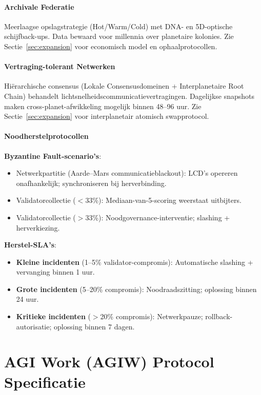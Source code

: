 \documentclass[11pt]{article}
\begin{document}
\paragraph{Archivale Federatie}
Meerlaagse opslagstrategie (Hot/Warm/Cold) met DNA- en 5D-optische schijfback-ups. Data bewaard voor millennia over planetaire kolonies. Zie Sectie~\ref{sec:expansion} voor economisch model en ophaalprotocollen.

\paragraph{Vertraging-tolerant Netwerken}
Hiërarchische consensus (Lokale Consensusdomeinen + Interplanetaire Root Chain) behandelt lichtsnelheidscommunicatievertragingen. Dagelijkse snapshots maken cross-planet-afwikkeling mogelijk binnen 48--96 uur. Zie Sectie~\ref{sec:expansion} voor interplanetair atomisch swapprotocol.

\paragraph{Noodherstelprotocollen}
\textbf{Byzantine Fault-scenario's}:
\begin{itemize}[noitemsep]
  \item Netwerkpartitie (Aarde--Mars communicatieblackout): LCD's opereren onafhankelijk; synchroniseren bij herverbinding.
  \item Validatorcollectie ($<$33\%): Mediaan-van-5-scoring weerstaat uitbijters.
  \item Validatorcollectie ($>$33\%): Noodgovernance-interventie; slashing + herverkiezing.
\end{itemize}

\textbf{Herstel-SLA's}:
\begin{itemize}[noitemsep]
  \item \textbf{Kleine incidenten} (1--5\% validator-compromis): Automatische slashing + vervanging binnen 1 uur.
  \item \textbf{Grote incidenten} (5--20\% compromis): Noodraadszitting; oplossing binnen 24 uur.
  \item \textbf{Kritieke incidenten} ($>$20\% compromis): Netwerkpauze; rollback-autorisatie; oplossing binnen 7 dagen.
\end{itemize}

\section{AGI Work (AGIW) Protocol Specificatie}
\label{sec:agiw-spec}
\end{document}
